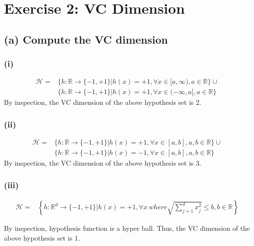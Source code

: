 \documentclass[11pt]{article}
\begin{document}
\section*{Exercise 2: VC Dimension}
\subsection*{(a) Compute the VC dimension}
\subsubsection*{(i)}
\begin{equation}
\begin{split}
\mathcal{H}=&\{h:\mathbb{R}\rightarrow\{-1,+1\}|h(x)=+1,\forall x\in[a,\infty), a\in\mathbb{R}\} \cup \\
&\{h:\mathbb{R}\rightarrow\{-1,+1\}|h(x)=+1,\forall x\in(-\infty,a], a\in\mathbb{R}\}
\end{split}
\end{equation}
By inspection, the VC dimension of the above hypothesis set is 2.

\subsubsection*{(ii)}
\begin{equation}
\begin{split}
\mathcal{H}=&\{h:\mathbb{R}\rightarrow\{-1,+1\}|h(x)=+1,\forall x\in[a,b], a,b\in\mathbb{R}\} \cup \\
&\{h:\mathbb{R}\rightarrow\{-1,+1\}|h(x)=-1,\forall x\in[a,b], a,b\in\mathbb{R}\}
\end{split}
\end{equation}
By inspection, the VC dimension of the above hypothesis set is 3.

\subsubsection*{(iii)}
\begin{equation}
\begin{split}
\mathcal{H}=&\left\{h:\mathbb{R}^d\rightarrow\{-1,+1\}|h(x)=+1,\forall x\ where \sqrt{\sum_{j=1}^{d} x_j^2}\le b, b\in\mathbb{R}\right\}
\end{split}
\end{equation}

By inspection, hypothesis function is a hyper ball. Thus, the VC dimension of the above hypothesis set is 1.
\end{document}
